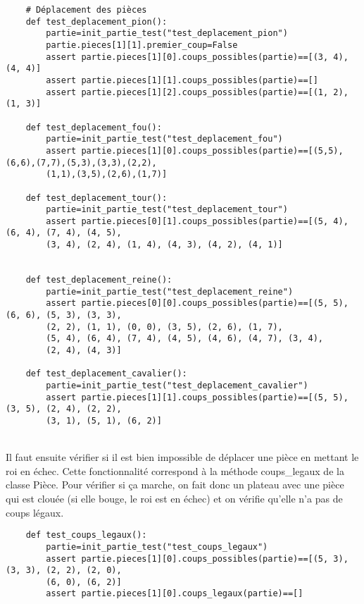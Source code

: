 \documentclass{article}
\begin{document}
\begin{verbatim}
    # Déplacement des pièces
    def test_deplacement_pion():
        partie=init_partie_test("test_deplacement_pion")
        partie.pieces[1][1].premier_coup=False
        assert partie.pieces[1][0].coups_possibles(partie)==[(3, 4), (4, 4)]
        assert partie.pieces[1][1].coups_possibles(partie)==[]
        assert partie.pieces[1][2].coups_possibles(partie)==[(1, 2), (1, 3)]
    
    def test_deplacement_fou():
        partie=init_partie_test("test_deplacement_fou")
        assert partie.pieces[1][0].coups_possibles(partie)==[(5,5),(6,6),(7,7),(5,3),(3,3),(2,2),
        (1,1),(3,5),(2,6),(1,7)]
                
    def test_deplacement_tour():
        partie=init_partie_test("test_deplacement_tour")
        assert partie.pieces[0][1].coups_possibles(partie)==[(5, 4), (6, 4), (7, 4), (4, 5), 
        (3, 4), (2, 4), (1, 4), (4, 3), (4, 2), (4, 1)]
    
    
    def test_deplacement_reine():
        partie=init_partie_test("test_deplacement_reine")
        assert partie.pieces[0][0].coups_possibles(partie)==[(5, 5), (6, 6), (5, 3), (3, 3), 
        (2, 2), (1, 1), (0, 0), (3, 5), (2, 6), (1, 7), 
        (5, 4), (6, 4), (7, 4), (4, 5), (4, 6), (4, 7), (3, 4), 
        (2, 4), (4, 3)]
    
    def test_deplacement_cavalier():   
        partie=init_partie_test("test_deplacement_cavalier")
        assert partie.pieces[1][1].coups_possibles(partie)==[(5, 5), (3, 5), (2, 4), (2, 2), 
        (3, 1), (5, 1), (6, 2)]
\end{verbatim}

\\
Il faut ensuite vérifier si il est bien impossible de déplacer une pièce en mettant le roi en échec. Cette fonctionnalité correspond à la méthode coups\_legaux de la classe Pièce. Pour vérifier si ça marche, on fait donc un plateau avec une pièce qui est clouée (si elle bouge, le roi est en échec) et on vérifie qu'elle n'a pas de coups légaux.

\begin{verbatim}
    def test_coups_legaux():
        partie=init_partie_test("test_coups_legaux")
        assert partie.pieces[1][0].coups_possibles(partie)==[(5, 3), (3, 3), (2, 2), (2, 0), 
        (6, 0), (6, 2)]
        assert partie.pieces[1][0].coups_legaux(partie)==[]
\end{verbatim}
\end{document}
